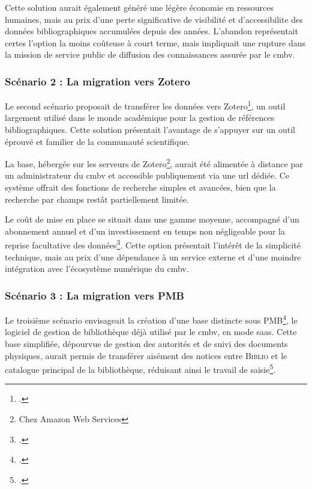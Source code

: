 Cette solution aurait également généré une légère économie en ressources humaines, mais au prix d'une perte significative de visibilité et d'\gls{accessibilite} des données bibliographiques accumulées depuis des années. L'abandon représentait certes l'option la moins coûteuse à court terme, mais impliquait une rupture dans la mission de service public de diffusion des connaissances assurée par le \gls{cmbv}.

\subsubsection{Scénario 2 : La migration vers Zotero}

Le second scénario proposait de transférer les données vers Zotero\footcite{laurentguilloEtudeEvolutionBase2023}, un outil largement utilisé dans le monde académique pour la gestion de références bibliographiques. Cette solution présentait l'avantage de s'appuyer sur un outil éprouvé et familier de la communauté scientifique.

La base, hébergée sur les serveurs de Zotero\footnote{Chez Amazon Web Services}, aurait été alimentée à distance par un administrateur du \gls{cmbv} et accessible publiquement via une \gls{url} dédiée. Ce système offrait des fonctions de recherche simples et avancées, bien que la recherche par champs  restât partiellement limitée. 

Le coût de mise en place se situait dans une gamme moyenne, accompagné d'un abonnement annuel et d'un investissement en temps non négligeable pour la reprise facultative des données\footcite{laurentguilloEtudeEvolutionBase2023}. Cette option présentait l'intérêt de la simplicité technique, mais au prix d'une dépendance à un service externe et d'une moindre intégration avec l'écosystème numérique du \gls{cmbv}.

\subsubsection{Scénario 3 : La migration vers PMB}

Le troisième scénario envisageait la création d'une base distincte sous PMB\footcite{laurentguilloEtudeEvolutionBase2023}, le logiciel de gestion de bibliothèque déjà utilisé par le \gls{cmbv}, en mode \gls{saas}. Cette base simplifiée, dépourvue de gestion des autorités et de suivi des documents physiques, aurait permis de transférer aisément des notices entre \textsc{Biblio} et le catalogue principal de la bibliothèque, réduisant ainsi le travail de saisie\footcite{laurentguilloEtudeEvolutionBase2023}.

